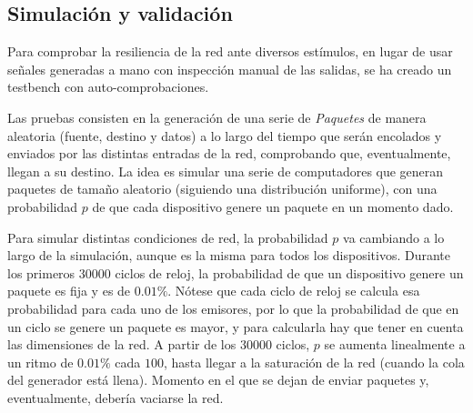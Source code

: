 \subsection{Simulación y validación}
\label{subsec:rtl_simulacion}
Para comprobar la resiliencia de la red ante diversos estímulos, en lugar de usar señales generadas a mano con inspección manual de las salidas, se ha creado un testbench con auto-comprobaciones.

Las pruebas consisten en la generación de una serie de \textit{Paquetes} de manera aleatoria (fuente, destino y datos) a lo largo del tiempo que serán encolados y enviados por las distintas entradas de la red, comprobando que, eventualmente, llegan a su destino. La idea es simular una serie de computadores que generan paquetes de tamaño aleatorio (siguiendo una distribución uniforme), con una probabilidad $p$ de que cada dispositivo genere un paquete en un momento dado.

Para simular distintas condiciones de red, la probabilidad $p$ va cambiando a lo largo de la simulación, aunque es la misma para todos los dispositivos. Durante los primeros $30000$ ciclos de reloj, la probabilidad de que un dispositivo genere un paquete es fija y es de $0.01\%$.
Nótese que cada ciclo de reloj se calcula esa probabilidad para cada uno de los emisores, por lo que la probabilidad de que en un ciclo se genere un paquete es mayor, y para calcularla hay que tener en cuenta las dimensiones de la red.
A partir de los $30000$ ciclos, $p$ se aumenta linealmente a un ritmo de $0.01\%$ cada $100$, hasta llegar a la saturación de la red (cuando la cola del generador está llena). Momento en el que se dejan de enviar paquetes y, eventualmente, debería vaciarse la red.

